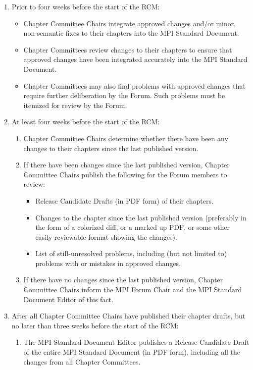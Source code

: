 \begin{enumerate}
\item Prior to four weeks before the start of the RCM:
  \begin{itemize}
  \item Chapter Committee Chairs integrate approved changes and/or
    minor, non-semantic fixes to their chapters into the MPI Standard
    Document.
  \item Chapter Committees review changes to their chapters to ensure
    that approved changes have been integrated accurately into the MPI
    Standard Document.
  \item Chapter Committees may also find problems with approved
    changes that require further deliberation by the Forum.  Such
    problems must be itemized for review by the Forum.
  \end{itemize}

\item At least four weeks before the start of the RCM:
  \begin{enumerate}
  \item Chapter Committee Chairs determine whether there have been
    any changes to their chapters since the last published version.
  \item If there have been changes since the last published version,
    Chapter Committee Chairs publish the following for the Forum
    members to review:
    \begin{itemize}
      \item Release Candidate Drafts (in PDF form) of their chapters.
      \item Changes to the chapter since the last published version
        (preferably in the form of a colorized diff, or a marked up
        PDF, or some other easily-reviewable format showing the
        changes).
      \item List of still-unresolved problems, including (but not
        limited to) problems with or mistakes in approved changes.
    \end{itemize}
  \item If there have no changes since the last published version,
    Chapter Committee Chairs inform the MPI Forum Chair and the MPI
    Standard Document Editor of this fact.
  \end{enumerate}

\item After all Chapter Committee Chairs have published their chapter
  drafts, but no later than three weeks before the start of the RCM:
  \begin{enumerate}
  \item The MPI Standard Document Editor publishes a Release Candidate
    Draft of the entire MPI Standard Document (in PDF form), including
    all the changes from all Chapter Committees.
  \end{enumerate}


\end{enumerate}

